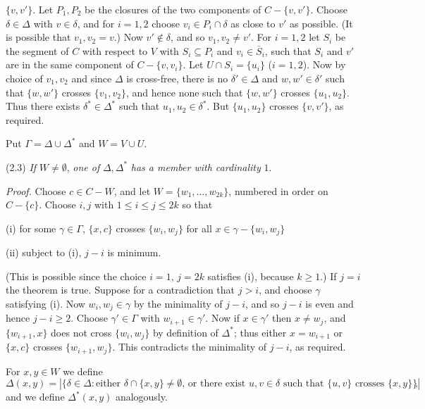 \noindent $\{v, v'\}$. Let $P_1, P_2$ be the closures of the two components of $C - \{v, v'\}$. Choose $\delta \in \Delta$ with $v \in \delta$, and for $i = 1, 2$ choose $v_i \in P_i \cap \delta$ as close to $v'$ as possible. (It is possible that $v_1, v_2 = v$.) Now $v' \notin \delta$, and so $v_1, v_2 \ne v'$. For $i = 1, 2$ let $S_i$ be the segment of $C$ with respect to $V$ with $S_i \subseteq P_i$ and $v_i \in \bar{S}_i$, such that $S_i$ and $v'$ are in the same component of $C - \{v, v_i\}$. Let $U \cap S_i = \{u_i\}$ ($i = 1, 2$). Now by choice of $v_1, v_2$ and since $\Delta$ is cross-free, there is no $\delta' \in \Delta$ and $w, w' \in \delta'$ such that $\{w, w'\}$ crosses $\{v_1, v_2\}$, and hence none such that $\{w, w'\}$ crosses $\{u_1, u_2\}$. Thus there exists $\delta^* \in \Delta^*$ such that $u_1, u_2 \in \delta^*$. But $\{u_1, u_2\}$ crosses $\{v, v'\}$, as required.

Put $\Gamma = \Delta \cup \Delta^*$ and $W = V \cup U$.

\stmt
(2.3) \textit{If} $W \ne \emptyset$, \textit{one of} $\Delta, \Delta^*$ \textit{has a member with cardinality} $1$.

\textit{Proof.} Choose $c \in C - W$, and let $W = \{w_1, \dots, w_{2k}\}$, numbered in order on $C - \{c\}$. Choose $i, j$ with $1 \le i \le j \le 2k$ so that

\hspace*{12pt}(i) for some $\gamma \in \Gamma$, $\{x, c\}$ crosses $\{w_i, w_j\}$ for all $x \in \gamma - \{w_i, w_j\}$

\hspace*{12pt}(ii) subject to (i), $j - i$ is minimum.

(This is possible since the choice $i = 1$, $j = 2k$ satisfies (i), because $k \ge 1$.) If $j = i$ the theorem is true. Suppose for a contradiction that $j > i$, and choose $\gamma$ satisfying (i). Now $w_i, w_j \in \gamma$ by the minimality of $j - i$, and so $j - i$ is even and hence $j - i \ge 2$. Choose $\gamma' \in \Gamma$ with $w_{i+1} \in \gamma'$. Now if $x \in \gamma'$ then $x \ne w_j$, and $\{w_{i+1}, x\}$ does not cross $\{w_i, w_j\}$ by definition of $\Delta^*$; thus either $x = w_{i+1}$ or $\{x, c\}$ crosses $\{w_{i+1}, w_j\}$. This contradicts the minimality of $j - i$, as required.

For $x, y \in W$ we define
\begin{equation*}
\Delta(x, y) = |\{\delta \in \Delta : \text{either } \delta \cap \{x, y\} \ne \emptyset\text{, or there exist } u, v \in \delta \text{ such that } \{u, v\} \text{ crosses } \{x, y\}\}|,
\end{equation*}
and we define $\Delta^*(x, y)$ analogously.

